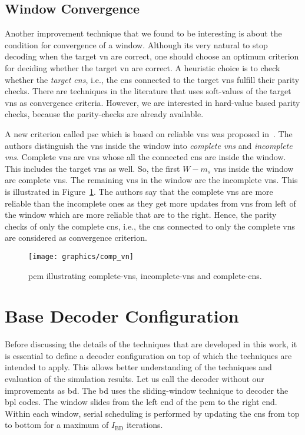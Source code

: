 \subsection{Window Convergence}
Another improvement technique that we found to be interesting is about the condition for convergence of a window. Although its very natural to stop decoding when the target \gls{vn} are correct, one should choose an optimum criterion for deciding whether the target \gls{vn} are correct. A heuristic choice is to check whether the \emph{target \glspl{cn}}, i.e., the \glspl{cn} connected to the target \glspl{vn} fulfill their parity checks. There are techniques in the literature that uses soft-values of the target \glspl{vn} as convergence criteria. However, we are interested in hard-value based parity checks, because the parity-checks are already available.

A new criterion called \gls{psc} which is based on reliable \glspl{vn} was proposed in~\cite{Kang2018}. The authors distinguish the \glspl{vn} inside the window into \emph{complete \glspl{vn}} and \emph{incomplete \glspl{vn}}. Complete \glspl{vn} are \glspl{vn} whose all the connected \glspl{cn} are inside the window. This includes the target \glspl{vn} as well. So, the first $W-m_s$ \glspl{vn} inside the window are complete \glspl{vn}. The remaining \glspl{vn} in the window are the incomplete \glspl{vn}. This is illustrated in Figure~\ref{fig:comp_vn}. The authors say that the complete \glspl{vn} are more reliable than the incomplete ones as they get more updates from \glspl{vn} from left of the window which are more reliable that are to the right. Hence, the parity checks of only the complete \glspl{cn}, i.e., the \glspl{cn} connected to only the complete \glspl{vn} are considered as convergence criterion.
\begin{figure}[htbp]
  \centering
  \texttt{[image: graphics/comp\_vn]}
  \caption[Illustration of different categories.]{\gls{pcm} illustrating complete-\glspl{vn}, incomplete-\glspl{vn} and complete-\glspl{cn}.}
  \label{fig:comp_vn}
\end{figure}

\section{Base Decoder Configuration}
Before discussing the details of the techniques that are developed in this work, it is essential to define a decoder configuration on top of which the techniques are intended to apply. This allows better understanding of the techniques and evaluation of the simulation results. Let us call the decoder without our improvements as \gls{bd}. The \gls{bd} uses the sliding-window technique to decoder the \gls{bpl} codes. The window slides from the left end of the \gls{pcm} to the right end. Within each window, serial scheduling is performed by updating the \glspl{cn} from top to bottom for a maximum of $I_{\text{BD}}$ iterations.

